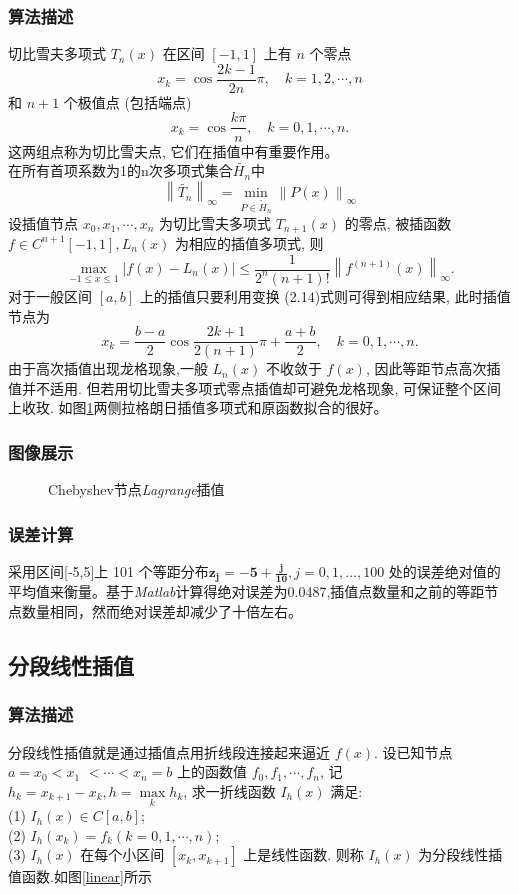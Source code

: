 \documentclass{ctexart}%
\begin{document}
\subsubsection{算法描述}
切比雪夫多项式 $T_{n}(x)$ 在区间 $[-1,1]$ 上有 $n$ 个零点
$$
x_{k}=\cos \frac{2 k-1}{2 n} \pi, \quad k=1,2, \cdots, n
$$
和 $n+1$ 个极值点 (包括端点)
$$
x_{k}=\cos \frac{k \pi}{n}, \quad k=0,1, \cdots, n .
$$
这两组点称为切比雪夫点, 它们在插值中有重要作用。\\
在所有首项系数为1的n次多项式集合$\tilde{H_n}$中
$$\left \| \tilde{T_n} \right \|_\infty = \min\limits_{P\in  \tilde{H}_n}   \left \| P(x) \right \|_\infty$$
设插值节点 $x_{0}, x_{1}, \cdots, x_{n}$ 为切比雪夫多项式 $T_{n+1}(x)$ 的零点, 被插函数 $f \in C^{n+1}[-1,1], L_{n}(x)$ 为相应的插值多项式, 则
$$
\max _{-1 \leqslant x \leqslant 1}\left|f(x)-L_{n}(x)\right| \leqslant \frac{1}{2^{n}(n+1) !}\left\|f^{(n+1)}(x)\right\|_{\infty} .
$$
对于一般区间 $[a, b]$ 上的插值只要利用变换 (2.14)式则可得到相应结果, 此时插值节点为
$$
x_{k}=\frac{b-a}{2} \cos \frac{2 k+1}{2(n+1)} \pi+\frac{a+b}{2}, \quad k=0,1, \cdots, n .
$$
由于高次插值出现龙格现象,一般 $L_{n}(x)$ 不收敛于 $f(x)$, 因此等距节点高次插值并不适用. 但若用切比雪夫多项式零点插值却可避免龙格现象, 可保证整个区间上收玫.
如图\ref{chebyshev}两侧拉格朗日插值多项式和原函数拟合的很好。

\subsubsection{图像展示}
\begin{figure}[H]
    \centering
    
    \caption{Chebyshev节点\textit{Lagrange}插值}
    \label{chebyshev}
\end{figure}

\subsubsection{误差计算}
采用区间[‐5,5]上 101 个等距分布$\mathbf{z_j=-5+\frac{j}{10}},j=0,1,...,100$
处的误差绝对值的平均值来衡量。基于\textit{Matlab}计算得绝对误差为0.0487,插值点数量和之前的等距节点数量相同，然而绝对误差却减少了十倍左右。

\subsection{分段线性插值}
\subsubsection{算法描述}
分段线性插值就是通过插值点用折线段连接起来逼近 $f(x)$. 设已知节点 $a=x_{0}<x_{1}$ $<\cdots<x_{n}=b$ 上的函数值 $f_{0}, f_{1}, \cdots, f_{n}$, 记 $h_{k}=x_{k+1}-x_{k}, h=\max\limits_{k} h_{k}$, 求一折线函数 $I_{h}(x)$ 满足:\\
(1) $I_{h}(x) \in C[a, b]$;\\
(2) $I_{h}\left(x_{k}\right)=f_{k}(k=0,1, \cdots, n)$;\\
(3) $I_{h}(x)$ 在每个小区间 $\left[x_{k}, x_{k+1}\right]$ 上是线性函数. 则称 $I_{h}(x)$ 为分段线性插值函数.如图\ref{linear}所示
\end{document}
